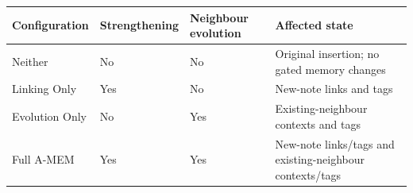 \begingroup
\small
\setlength{\tabcolsep}{4pt}
\noindent\begin{tabular}{@{}>{\raggedright\arraybackslash}p{}>{\raggedright\arraybackslash}p{}>{\raggedright\arraybackslash}p{}>{\raggedright\arraybackslash}p{}@{}}
\toprule
Configuration & Strengthening & Neighbour evolution & Affected state \\
\midrule
Neither & No & No & Original insertion; no gated memory changes \\
Linking Only & Yes & No & New-note links and tags \\
Evolution Only & No & Yes & Existing-neighbour contexts and tags \\
Full A-MEM & Yes & Yes & New-note links/tags and existing-neighbour contexts/tags \\
\bottomrule
\end{tabular}
\par\medskip
\endgroup
